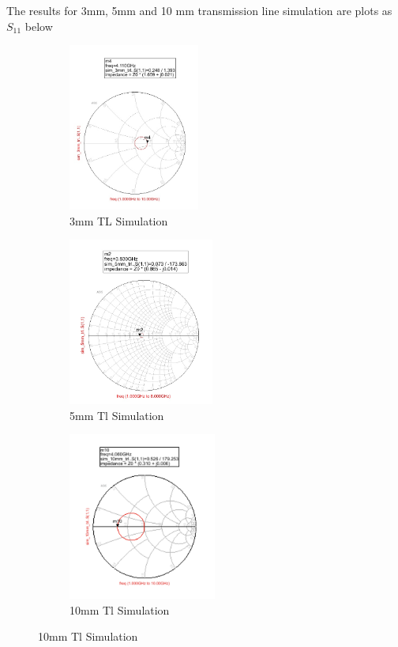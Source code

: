 \documentclass{article}
\begin{document}
The results for 3mm, 5mm and 10 mm transmission line simulation are plots as $S_{11}$ below
\begin{figure}[h]
\centering
\begin{subfigure}{0.29\textwidth}
\includegraphics[width=1\linewidth,height = 5.5cm]{figures/tempplot/3mm_sim.jpg} 
\caption{3mm TL Simulation}
\label{fig:subim1}
\end{subfigure}
\begin{subfigure}{0.3\textwidth}
\includegraphics[width=1\linewidth,height = 5.5cm]{figures/tempplot/5mm_sim.jpg}
\caption{5mm Tl Simulation}
\label{fig:subim2}
\end{subfigure}
\begin{subfigure}{0.33\textwidth}
\includegraphics[width=1\linewidth, height = 5.5cm]{figures/tempplot/10mm_sim.png}
\caption{10mm Tl Simulation}
\label{fig:subim3}
\end{subfigure}
\end{figure}
\end{document}
